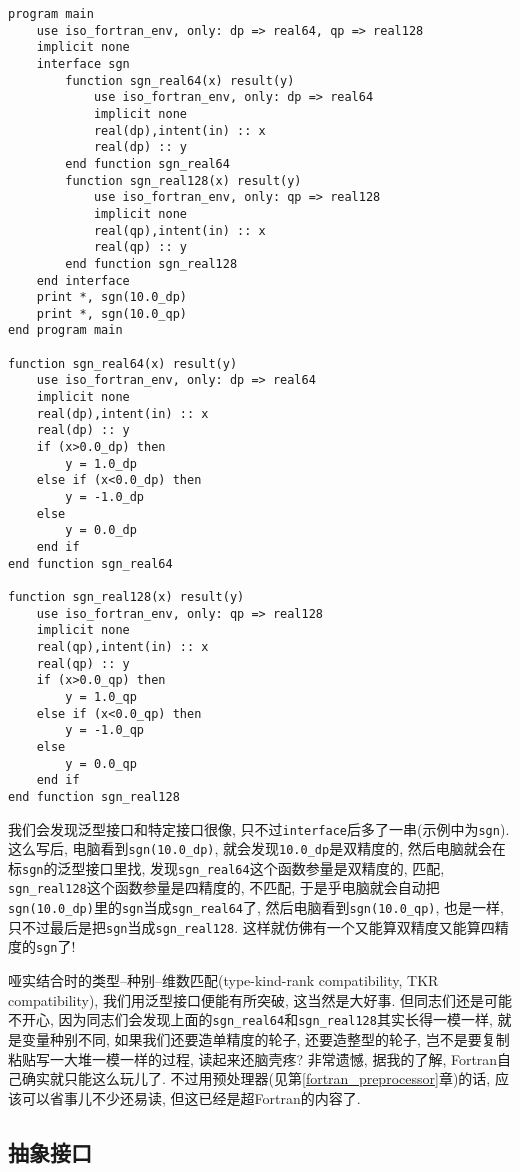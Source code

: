 \begin{verbatim}
program main
    use iso_fortran_env, only: dp => real64, qp => real128
    implicit none
    interface sgn
        function sgn_real64(x) result(y)
            use iso_fortran_env, only: dp => real64
            implicit none
            real(dp),intent(in) :: x
            real(dp) :: y
        end function sgn_real64
        function sgn_real128(x) result(y)
            use iso_fortran_env, only: qp => real128
            implicit none
            real(qp),intent(in) :: x
            real(qp) :: y
        end function sgn_real128
    end interface
    print *, sgn(10.0_dp)
    print *, sgn(10.0_qp)
end program main

function sgn_real64(x) result(y)
    use iso_fortran_env, only: dp => real64
    implicit none
    real(dp),intent(in) :: x
    real(dp) :: y
    if (x>0.0_dp) then
        y = 1.0_dp
    else if (x<0.0_dp) then
        y = -1.0_dp
    else
        y = 0.0_dp
    end if
end function sgn_real64

function sgn_real128(x) result(y)
    use iso_fortran_env, only: qp => real128
    implicit none
    real(qp),intent(in) :: x
    real(qp) :: y
    if (x>0.0_qp) then
        y = 1.0_qp
    else if (x<0.0_qp) then
        y = -1.0_qp
    else
        y = 0.0_qp
    end if
end function sgn_real128
\end{verbatim}
我们会发现泛型接口和特定接口很像, 只不过\verb|interface|后多了一串(示例中为\verb|sgn|). 这么写后, 电脑看到\verb|sgn(10.0_dp)|, 就会发现\verb|10.0_dp|是双精度的, 然后电脑就会在标\verb|sgn|的泛型接口里找, 发现\verb|sgn_real64|这个函数参量是双精度的, 匹配, \verb|sgn_real128|这个函数参量是四精度的, 不匹配, 于是乎电脑就会自动把\verb|sgn(10.0_dp)|里的\verb|sgn|当成\verb|sgn_real64|了, 然后电脑看到\verb|sgn(10.0_qp)|, 也是一样, 只不过最后是把\verb|sgn|当成\verb|sgn_real128|. 这样就仿佛有一个又能算双精度又能算四精度的\verb|sgn|了!

哑实结合时的类型--种别--维数匹配(type-kind-rank compatibility, TKR compatibility), 我们用泛型接口便能有所突破, 这当然是大好事. 但同志们还是可能不开心, 因为同志们会发现上面的\verb|sgn_real64|和\verb|sgn_real128|其实长得一模一样, 就是变量种别不同, 如果我们还要造单精度的轮子, 还要造整型的轮子, 岂不是要复制粘贴写一大堆一模一样的过程, 读起来还脑壳疼? 非常遗憾, 据我的了解, Fortran自己确实就只能这么玩儿了. 不过用预处理器(见第\ref{fortran_preprocessor}章)的话, 应该可以省事儿不少还易读, 但这已经是超Fortran的内容了.

\subsection{抽象接口}

